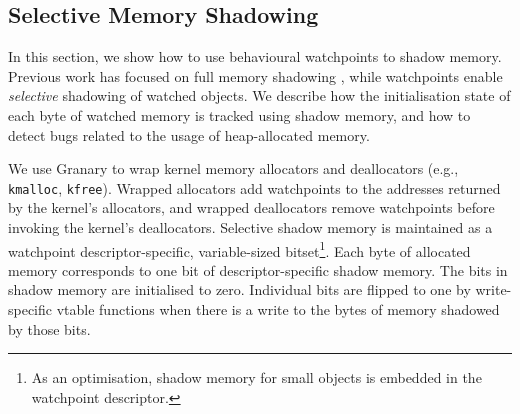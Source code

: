 \documentclass[letterpaper,twocolumn,10pt]{article}
\begin{document}
\subsection{Selective Memory Shadowing\label{sec:uninitialised_memory}}

In this section, we show how to use behavioural watchpoints to shadow memory. Previous work has focused on full memory shadowing \cite{Memcheck}, while watchpoints enable \emph{selective} shadowing of watched objects. We describe how the initialisation state of each byte of watched memory is tracked using shadow memory, and how to detect bugs related to the usage of heap-allocated memory.

We use Granary to wrap kernel memory allocators and deallocators (e.g., \texttt{kmalloc}, \texttt{kfree}). Wrapped allocators add watchpoints to the addresses returned by the kernel's allocators, and wrapped deallocators remove watchpoints before invoking the kernel's deallocators. Selective shadow memory is maintained as a watchpoint descriptor-specific, variable-sized bitset\footnote{As an optimisation, shadow memory for small objects is embedded in the watchpoint descriptor.}. Each byte of allocated memory corresponds to one bit of descriptor-specific shadow memory. The bits in shadow memory are initialised to zero. Individual bits are flipped to one by write-specific vtable functions when there is a write to the bytes of memory shadowed by those bits. 

 





\end{document}
